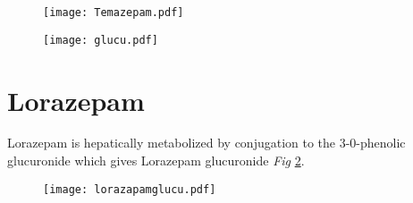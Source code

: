 \begin{figure}[h]
	\centering
	\begin{minipage}{0.5\linewidth}
		\centering
		\texttt{[image: Temazepam.pdf]}
		\label{fig:temazepam}
	\end{minipage}%
	\begin{minipage}{0.5\textwidth}
		\centering
		\texttt{[image: glucu.pdf]}
		\label{fig:norgluc}
	\end{minipage}
\end{figure}





\section{Lorazepam} 
Lorazepam is hepatically metabolized by conjugation to the 3-0-phenolic glucuronide which gives Lorazepam glucuronide \emph{Fig} \ref{fig:lorgluc}.\cite{elliott1976metabolism}

\begin{figure}[h]
	\centering
	\texttt{[image: lorazapamglucu.pdf]}
	\label{fig:lorgluc}
\end{figure}
